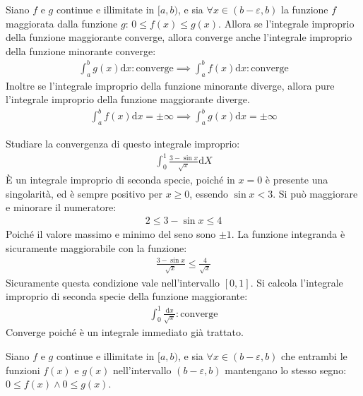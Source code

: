 \documentclass{article}
\numberwithin{equation}{subsection}
\begin{document}
Siano $f$ e $g$ continue e illimitate in $[a, b)$, e sia $\forall x\in(b-\varepsilon, b)$ la funzione $f$ maggiorata dalla funzione $g$: $0\leq f(x)\leq g(x)$. 
Allora se l'integrale improprio della funzione maggiorante converge, allora converge anche l'integrale improprio della funzione minorante converge:
\begin{gather*}
    \displaystyle\int_a^b g(x)\mathrm{d}x:\mbox{converge}\implies
    \displaystyle\int_a^b f(x)\mathrm{d}x:\mbox{converge}
\end{gather*}
Inoltre se l'integrale improprio della funzione minorante diverge, allora pure l'integrale improprio della funzione maggiorante diverge. 
\begin{gather*}
    \displaystyle\int_a^b f(x)\mathrm{d}x=\pm\infty\implies
    \displaystyle\int_a^b g(x)\mathrm{d}x=\pm\infty
\end{gather*}



Studiare la convergenza di questo integrale improprio:
\begin{gather*}
    \displaystyle\int_0^1\frac{3-\sin x}{\sqrt{x}}\mathrm{d}X
\end{gather*}
È un integrale improprio di seconda specie, poiché in $x=0$ è presente una singolarità, ed è sempre positivo per $x\geq0$, essendo $\sin x<3$. 
Si può maggiorare e minorare il numeratore:
\begin{gather*}
    2\leq3-\sin x\leq4
\end{gather*}
Poiché il valore massimo e minimo del seno sono $\pm1$. La funzione integranda è sicuramente maggiorabile con la funzione:
\begin{gather*}
    \displaystyle\frac{3-\sin x}{\sqrt{x}}\leq\frac{4}{\sqrt{x}}
\end{gather*}
Sicuramente questa condizione vale nell'intervallo $[0,1]$. Si calcola l'integrale improprio di seconda specie della funzione maggiorante:
\begin{gather*}
    \displaystyle\int_0^1\frac{\mathrm{d}x}{\sqrt{x}}:\mbox{converge}
\end{gather*}
Converge poiché è un integrale immediato già trattato. 



Siano $f$ e $g$ continue e illimitate in $[a, b)$, e sia $\forall x\in(b-\varepsilon, b)$ che entrambi le funzioni $f(x)$ e $g(x)$ nell'intervallo $(b-\varepsilon, b)$ mantengano lo stesso segno: $0\leq f(x)\land0\leq g(x)$. %
\end{document}
